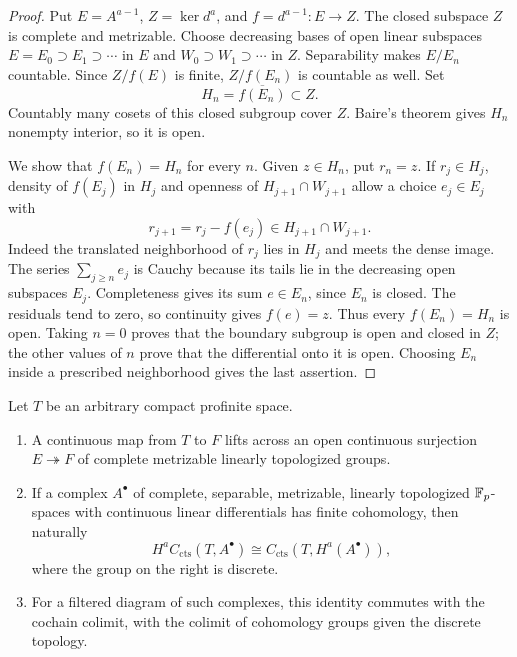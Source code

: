 \begin{proof}
Put $E=A^{a-1}$, $Z=\ker d^a$, and $f=d^{a-1}:E\to Z$.
The closed subspace $Z$ is complete and metrizable.  Choose decreasing
bases of open linear subspaces $E=E_0\supset E_1\supset\cdots$ in
$E$ and $W_0\supset W_1\supset\cdots$ in $Z$.
Separability makes $E/E_n$ countable.  Since $Z/f(E)$ is finite,
$Z/f(E_n)$ is countable as well.  Set
\[
 H_n=\overline{f(E_n)}\subset Z.
\]
Countably many cosets of this closed subgroup cover $Z$.
Baire's theorem gives $H_n$ nonempty interior, so it is open.

We show that $f(E_n)=H_n$ for every $n$.
Given $z\in H_n$, put $r_n=z$.  If $r_j\in H_j$, density of
$f(E_j)$ in $H_j$ and openness of $H_{j+1}\cap W_{j+1}$ allow a
choice $e_j\in E_j$ with
\[
 r_{j+1}=r_j-f(e_j)\in H_{j+1}\cap W_{j+1}.
\]
Indeed the translated neighborhood of $r_j$ lies in $H_j$ and meets
the dense image.  The series $\sum_{j\ge n}e_j$ is Cauchy because
its tails lie in the decreasing open subspaces $E_j$.
Completeness gives its sum $e\in E_n$, since $E_n$ is closed.
The residuals tend to zero, so continuity gives $f(e)=z$.
Thus every $f(E_n)=H_n$ is open.  Taking $n=0$ proves that the
boundary subgroup is open and closed in $Z$; the other values of
$n$ prove that the differential onto it is open.  Choosing $E_n$
inside a prescribed neighborhood gives the last assertion.
\end{proof}

\begin{lemma}
\label{lem:profinite-parameters}
Let $T$ be an arbitrary compact profinite space.
\begin{enumerate}
\item A continuous map from $T$ to $F$ lifts across an open continuous
surjection $E\twoheadrightarrow F$ of complete metrizable linearly
topologized groups.
\item If a complex $A^\bullet$ of complete, separable, metrizable, linearly
topologized $\mathbb F_p$-spaces with continuous linear differentials has finite
cohomology, then naturally
\begin{equation}
 \label{eq:finite-cohomology-parameters}
 H^a C_{\mathrm{cts}}(T,A^\bullet)
 \cong C_{\mathrm{cts}}(T,H^a(A^\bullet)),
\end{equation}
where the group on the right is discrete.
\item For a filtered diagram of such complexes, this identity commutes
with the cochain colimit, with the colimit of cohomology groups given
the discrete topology.
\end{enumerate}
\end{lemma}

